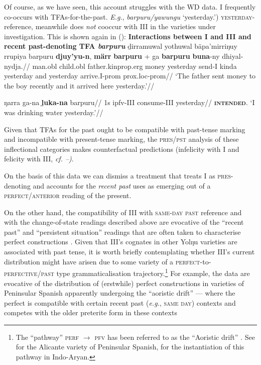 Of course, as we have seen, this account struggles with the WD data. \gls{I} frequently co-occurs with TFAs-for-the-past. \textit{E.g.}, \textit{barpuru/yawungu} `yesterday.') \textsc{yesterday-}reference, meanwhile does \textit{not} cooccur with \gls{III} in the varieties under investigation. This is shown again in ():
\pex{}\textbf{Interactions between \gls{I} and \gls{III} and recent past-denoting TFA \textit{barpuru}}
\a\begingl{}\gla ḏirramuwal yothuwal bäpa'mirriŋuy rrupiya barpuru \textbf{djuy'yu-n}, \textbf{märr} \textbf{barpuru} + ga \textbf{barpuru} \textbf{buna}-ny dhiyal-nydja.//
\glb man.\gls{obl} child.\gls{obl} father.\gls{kinprop}.\gls{erg} money yesterday send-\gls{I} kinda yesterday and yesterday arrive.\gls{I}-\gls{prom} \gls{prox}.\gls{loc}-\gls{prom}//
\glft`The father sent money to the boy recently and it arrived here yesterday.'//
\endgl

\a{}\begingl\gla \ljudge{*}ŋarra ga-na \textbf{ḻuka-na} barpuru//
\glb 1s \gls{ipfv}-\gls{III} consume-\gls{III} yesterday//
\glft\textsc{\textbf{intended}.} `I was drinking water yesterday.'\trailingcitation{[DhG~20190405]}//\endgl


\xe

Given that TFAs for the past ought to be compatible with past-tense marking and incompatible with present-tense marking, the \textsc{pres/pst} analysis of these inflectional categories makes counterfactual predictions (infelicity with \gls{I} and felicity with \gls{III}, \textit{cf. --)}.

 On the basis of this data we can dismiss a treatment that treats \gls{I} as \textsc{pres}-denoting and accounts for the \textit{recent past} uses as emerging out of a \textsc{perfect/anterior} reading of the present.


On the other hand, the compatibility of \gls{III} with \textsc{same-day past} reference and with the change-of-state readings described above are evocative of the ``recent past'' and ``persistent situation'' readings that are often taken to characterise perfect constructions \citep[Ch. 3]{Comrie1976}. Given that \gls{III}'s cognates in other Yolŋu varieties are associated with past tense, it is worth briefly contemplating whether \gls{III}'s current distribution might have arisen due to some variety of a \textsc{perfect}-to-\textsc{perfective/past} type grammaticalisation trajectory.\footnote{The ``pathway'' \textsc{perf $ \to $ pfv} has been referred to as the ``Aoristic drift'' \citep{Schaden2009,Schaden2012}. See \citep{Schwenter1994} for the Alicante variety of Peninsular Spanish, \citep{Condoravdi2014} for the instantiation of this pathway in Indo-Aryan.} For example, the data are evocative of the distribution of (erstwhile) perfect constructions in varieties of Peninsular Spanish apparently undergoing the ``aoristic drift'' --- where the perfect is compatible with certain recent past (\textit{e.g.}, \textsc{same day}) contexts and competes with the older preterite form in these contexts \citetext{\textit{e.g.}, \citep{Howe2006} and \citep[115\textit{ff}]{CurelliGotor1990} for Catalan.}


